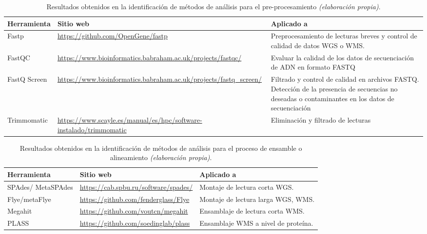 \documentclass[12pt]{article}
\begin{document}
\begin{table}[htbp]
    \centering
    \caption{Resultados obtenidos en la identificación de métodos de análisis para el pre-procesamiento \emph{(elaboración propia)}.}
    \label{tabla:preprocesamiento}
    \begin{tabularx}{\textwidth}{|p{3cm}|X|X|}
        \hline
        \textbf{Herramienta} & \textbf{Sitio web} & \textbf{Aplicado a} \\
        \hline
        Fastp & \href{https://github.com/OpenGene/fastp}{\url{https://github.com/OpenGene/fastp}} & Preprocesamiento de lecturas breves y control de calidad de datos WGS o WMS. \\
        \hline
        FastQC & \href{https://www.bioinformatics.babraham.ac.uk/projects/fastqc/}{\url{https://www.bioinformatics.babraham.ac.uk/projects/fastqc/}} & Evaluar la calidad de los datos de secuenciación de ADN en formato FASTQ \\
        \hline
        FastQ Screen & \href{https://www.bioinformatics.babraham.ac.uk/projects/fastq_screen/}{\url{https://www.bioinformatics.babraham.ac.uk/projects/fastq_screen/}} & Filtrado y control de calidad en archivos FASTQ. Detección de la presencia de secuencias no deseadas o contaminantes en los datos de secuenciación \\
        \hline
        Trimmomatic & \href{https://www.scayle.es/manual/es/hpc/software-instalado/trimmomatic}{\url{https://www.scayle.es/manual/es/hpc/software-instalado/trimmomatic}} & Eliminación y filtrado de lecturas \\
        \hline
    \end{tabularx}
\end{table}

\begin{table}[htbp]
    \centering
    \caption{Resultados obtenidos en la identificación de métodos de análisis para el proceso de ensamble o alineamiento \emph{(elaboración propia)}.}
    \label{tabla:ensamble_alineamiento}
    \begin{tabularx}{\textwidth}{|p{3cm}|X|X|}
        \hline
        \textbf{Herramienta} & \textbf{Sitio web} & \textbf{Aplicado a} \\
        \hline
        SPAdes/
        MetaSPAdes & \href{https://cab.spbu.ru/software/spades/}{\url{https://cab.spbu.ru/software/spades/}} & Montaje de lectura corta WGS. \\
        \hline
        Flye/metaFlye & \href{https://github.com/fenderglass/Flye}{\url{https://github.com/fenderglass/Flye}} & Montaje de lectura larga WGS, WMS. \\
        \hline
        Megahit & \href{https://github.com/voutcn/megahit}{\url{https://github.com/voutcn/megahit}} & Ensamblaje de lectura corta WMS. \\
        \hline
        PLASS & \href{https://github.com/soedinglab/plass}{\url{https://github.com/soedinglab/plass}} & Ensamblaje WMS a nivel de proteína. \\
        \hline
    \end{tabularx}
\end{table}
\end{document}
